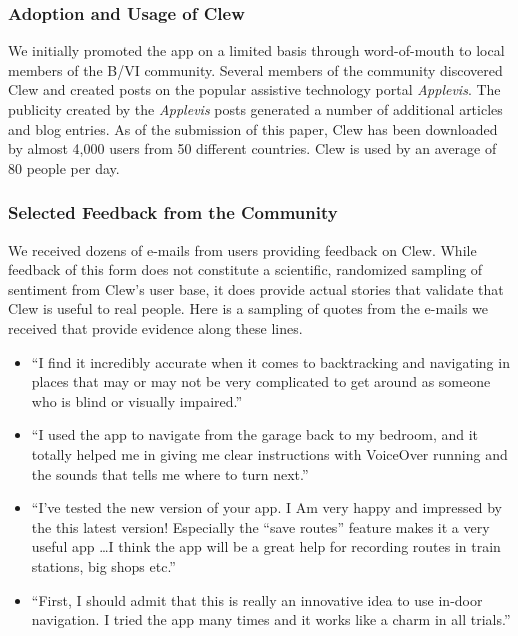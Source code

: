 \documentclass[chi_draft]{sigchi}
\newcommand{\BVI}{B/VI\xspace}
\begin{document}
\subsubsection{Adoption and Usage of Clew}

We initially promoted the app on a limited basis through word-of-mouth to local members of the \BVI community.  Several members of the community discovered Clew and created posts on the popular assistive technology portal \emph{Applevis}.  The publicity created by the \emph{Applevis} posts generated a number of additional articles and blog entries.  As of the submission of this paper, Clew has been downloaded by almost 4,000 users from 50 different countries.  Clew is used by an average of 80 people per day.

\subsubsection{Selected Feedback from the Community}
We received dozens of e-mails from users providing feedback on Clew.  While feedback of this form does not constitute a scientific, randomized sampling of sentiment from Clew's user base, it does provide actual stories that validate that Clew is useful to real people.  Here is a sampling of quotes from the e-mails we received that provide evidence along these lines.

\begin{itemize}
\item ``I find it incredibly accurate when it comes to backtracking and navigating in places that may or may not be very complicated to get around as someone who is blind or visually impaired.''
\item ``I used the app to navigate from the garage back to my bedroom, and it totally helped me in giving me clear instructions with VoiceOver running and the sounds that tells me where to turn next.''
\item ``I've tested the new version of your app.  I Am very happy and impressed by the this latest version!  Especially the “save routes” feature makes it a very useful app \ldots I think the app will be a great help for recording routes in train stations, big shops etc.''
\item ``First, I should admit that this is really an innovative idea to
use in-door navigation. I tried the app many times and it works like a
charm in all trials.''
\end{itemize}
\end{document}

